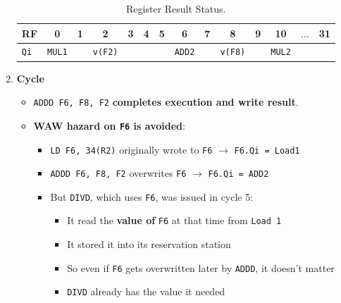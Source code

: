 \begin{enumerate}
    \begin{table}[!htp]
        \centering
        \begin{tabular}{@{} l | c c c c c c c c c c c c c @{}}
            \toprule
            RF              & 0                     & 1             & 2                     & 3             & 4             & 5             & 6                     & 7             & 8                     & 9             & 10                    & $\dots$           & 31            \\
            \midrule
            \texttt{Qi}     & \texttt{MUL1}         &               & \texttt{v(F2)}        &               &               &               & \texttt{ADD2}         &               & \texttt{v(F8)}        &               & \texttt{MUL2}         &                   &               \\
            \bottomrule
        \end{tabular}
        \caption*{Register Result Status.}
    \end{table}

    \newpage
    \setcounter{enumi}{12}


    \item \textbf{Cycle \theenumi}
    \begin{itemize}
        \item \texttt{ADDD  F6, F8, F2} \textbf{completes execution and write result}.
        \item \textbf{WAW hazard on \texttt{F6} is avoided}:
        \begin{itemize}
            \item \texttt{LD F6, 34(R2)} originally wrote to \texttt{F6} $\rightarrow$ \texttt{F6.Qi = Load1}
            \item \texttt{ADDD F6, F8, F2} overwrites \texttt{F6} $\rightarrow$ \texttt{F6.Qi = ADD2}
            \item But \texttt{DIVD}, which uses \texttt{F6}, was issued in cycle 5:
            \begin{itemize}
                \item It read the \textbf{value of} \texttt{F6} at that time from \texttt{Load 1}
                \item It stored it into its reservation station
                \item So even if \texttt{F6} gets overwritten later by \texttt{ADDD}, it doesn't matter
                \item \texttt{DIVD} already has the value it needed
            \end{itemize}
        \end{itemize}
    \end{itemize}


\end{enumerate}
